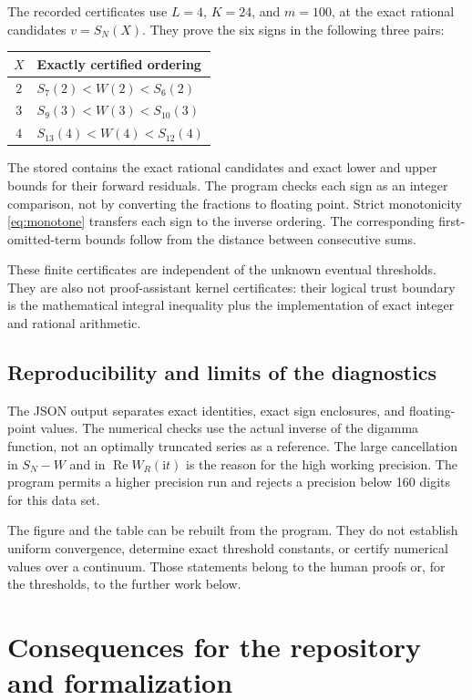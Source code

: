 \documentclass[11pt,a4paper]{article}
\theoremstyle{definition}
\numberwithin{equation}{section}
\newcommand{\ii}{\mathrm{i}}
\begin{document}
The recorded certificates use $L=4$, $K=24$, and $m=100$, at the exact
rational candidates $v=S_N(X)$. They prove the six signs in the following
three pairs:
\begin{center}
\begin{tabular}{cl}
\toprule
$X$ & Exactly certified ordering\\
\midrule
$2$ & $S_7(2)<W(2)<S_6(2)$\\
$3$ & $S_9(3)<W(3)<S_{10}(3)$\\
$4$ & $S_{13}(4)<W(4)<S_{12}(4)$\\
\bottomrule
\end{tabular}
\end{center}
The stored  contains the exact rational candidates
and exact lower and upper bounds for their forward residuals. The program
checks each sign as an integer comparison, not by converting the fractions
to floating point. Strict monotonicity \eqref{eq:monotone} transfers each
sign to the inverse ordering. The corresponding first-omitted-term bounds
follow from the distance between consecutive sums.

These finite certificates are independent of the unknown eventual
thresholds. They are also not proof-assistant kernel certificates: their
logical trust boundary is the mathematical integral inequality plus the
implementation of exact integer and rational arithmetic.

\subsection{Reproducibility and limits of the diagnostics}
The JSON output separates exact identities, exact sign enclosures, and
floating-point values. The numerical checks use the actual inverse of
the digamma function, not an optimally truncated series as a reference.
The large cancellation in $S_N-W$ and in $\operatorname{Re}W_R(\ii t)$
is the reason for the high working precision. The program permits a
higher precision run and rejects a precision below 160 digits for this
data set.

The figure and the table can be rebuilt from the program. They do not
establish uniform convergence, determine exact threshold constants,
or certify numerical values over a continuum. Those statements belong
to the human proofs or, for the thresholds, to the further work below.

\section{Consequences for the repository and formalization}
\label{sec:repository}
\end{document}
